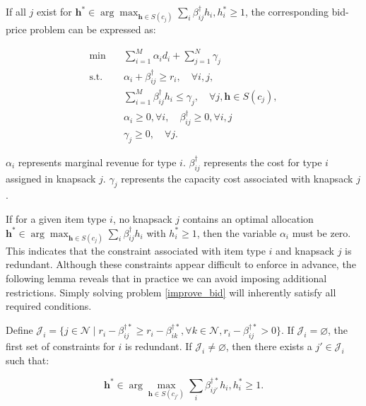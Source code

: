 If all $j$ exist for $\bm{h}^{*} \in \arg\max_{\bm{h} \in S(c_j)} \sum_{i} \beta_{ij}^{\dag} h_{i}, h_{i}^{*} \geq 1$, the corresponding bid-price problem can be expressed as:

\begin{equation}\label{improve_bid}
    \begin{aligned}
    \min \quad & \sum_{i=1}^M \alpha_i d_i+ \sum_{j=1}^N \gamma_j \\
    \mathrm{s.t.} \quad & \alpha_i+ \beta_{ij}^{\dag} \geq r_i, \quad \forall i, j, \\
    & \sum_{i=1}^M \beta_{ij}^{\dag} h_i \leq \gamma_j, \quad \forall j, \bm{h} \in S(c_j), \\
    & \alpha_i \geq 0, \forall i, \quad \beta_{ij}^{\dag} \geq 0, \forall i, j \\
    & \gamma_j \geq 0, \quad \forall j.
    \end{aligned}
\end{equation}

$\alpha_{i}$ represents marginal revenue for type $i$. $\beta_{ij}^{\dag}$ represents the cost for type $i$ assigned in knapsack $j$. $\gamma_{j}$ represents the capacity cost associated with knapsack $j$.

If for a given item type $i$, no knapsack $j$ contains an optimal allocation $\bm{h}^{*} \in \arg\max_{\bm{h} \in S(c_j)} \sum_{i} \beta_{ij}^{\dag} h_{i}$ with $h_{i}^{*} \geq 1$, then the variable $\alpha_{i}$ must be zero. This indicates that the constraint associated with item type $i$ and knapsack $j$ is redundant. Although these constraints appear difficult to enforce in advance, the following lemma reveals that in practice we can avoid imposing additional restrictions. Simply solving problem \eqref{improve_bid} will inherently satisfy all required conditions.


\begin{lem}\label{BPP}
Define $\mathcal{J}_{i} = \{j \in \mathcal{N} \mid r_i - \beta_{ij}^{\dag *} \geq r_i - \beta_{ik}^{\dag *},\forall k \in \mathcal{N}, r_i - \beta_{ij}^{\dag *} >0 \}$.
If $\mathcal{J}_{i} = \varnothing$, the first set of constraints for $i$ is redundant.
If $\mathcal{J}_{i} \neq \varnothing$, then there exists a $j{'} \in \mathcal{J}_{i}$ such that:

$$\bm{h}^{*} \in \arg\max_{\bm{h} \in S(c_{j{'}})} \sum_{i} \beta_{ij{'}}^{\dag *} h_{i}, h_{i}^{*} \geq 1.$$
\end{lem}

